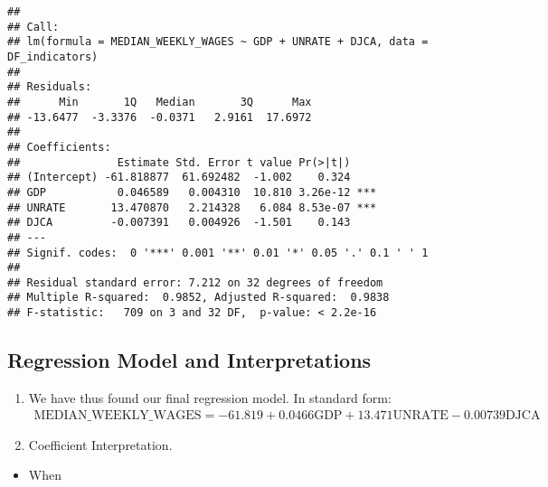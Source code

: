 \documentclass[
]{article}
\providecommand{\tightlist}{%
  \setlength{\itemsep}{0pt}\setlength{\parskip}{0pt}}
\begin{document}
\begin{verbatim}
## 
## Call:
## lm(formula = MEDIAN_WEEKLY_WAGES ~ GDP + UNRATE + DJCA, data = DF_indicators)
## 
## Residuals:
##      Min       1Q   Median       3Q      Max 
## -13.6477  -3.3376  -0.0371   2.9161  17.6972 
## 
## Coefficients:
##               Estimate Std. Error t value Pr(>|t|)    
## (Intercept) -61.818877  61.692482  -1.002    0.324    
## GDP           0.046589   0.004310  10.810 3.26e-12 ***
## UNRATE       13.470870   2.214328   6.084 8.53e-07 ***
## DJCA         -0.007391   0.004926  -1.501    0.143    
## ---
## Signif. codes:  0 '***' 0.001 '**' 0.01 '*' 0.05 '.' 0.1 ' ' 1
## 
## Residual standard error: 7.212 on 32 degrees of freedom
## Multiple R-squared:  0.9852, Adjusted R-squared:  0.9838 
## F-statistic:   709 on 3 and 32 DF,  p-value: < 2.2e-16
\end{verbatim}

\hypertarget{regression-model-and-interpretations}{%
\subsection{Regression Model and
Interpretations}\label{regression-model-and-interpretations}}

\begin{enumerate}
\def\labelenumi{\arabic{enumi}.}
\item
  We have thus found our final regression model. In standard form:
  \begin{align*}
  \text{MEDIAN_WEEKLY_WAGES} = -61.819 + 0.0466\text{GDP} + 13.471\text{UNRATE} - 0.00739\text{DJCA}
  \end{align*}
\item
  Coefficient Interpretation.
\end{enumerate}

\begin{itemize}
\tightlist
\item
  When
\end{itemize}
\end{document}
